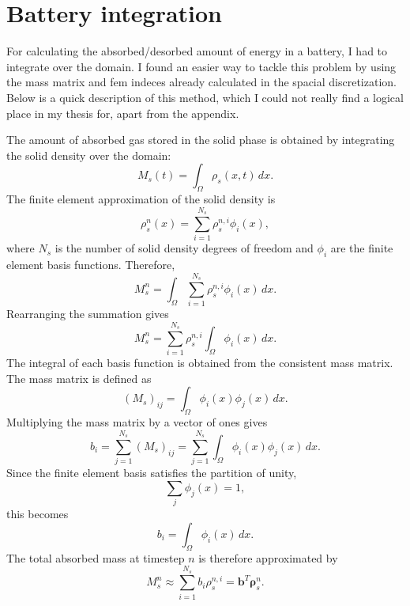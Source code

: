 \section{Battery integration}
For calculating the absorbed/desorbed amount of energy in a battery, I had to integrate over the domain. I found an easier way to tackle this problem by using the mass matrix and fem indeces already calculated in the spacial discretization. Below is a quick description of this method, which I could not really find a logical place in my thesis for, apart from the appendix.

The amount of absorbed gas stored in the solid phase is obtained by integrating the solid density over the domain:
\begin{equation}
M_s(t)=\int_{\Omega}\rho_s(x,t)\,dx .
\end{equation}
The finite element approximation of the solid density is
\begin{equation}
\rho_s^n(x)=\sum_{i=1}^{N_s} \rho_s^{n,i}\phi_i(x),
\end{equation}
where $N_s$ is the number of solid density degrees of freedom and
$\phi_i$ are the finite element basis functions. Therefore,
\begin{equation}
M_s^n
=
\int_{\Omega}
\sum_{i=1}^{N_s}\rho_s^{n,i}\phi_i(x)\,dx .
\end{equation}
Rearranging the summation gives
\begin{equation}
M_s^n
=
\sum_{i=1}^{N_s}
\rho_s^{n,i}
\int_{\Omega}\phi_i(x)\,dx .
\end{equation}
The integral of each basis function is obtained from the consistent mass matrix.
The mass matrix is defined as
\begin{equation}
(M_s)_{ij}
=
\int_{\Omega}\phi_i(x)\phi_j(x)\,dx .
\end{equation}
Multiplying the mass matrix by a vector of ones gives
\begin{equation}
b_i
=
\sum_{j=1}^{N_s}(M_s)_{ij}
=
\sum_{j=1}^{N_s}
\int_{\Omega}\phi_i(x)\phi_j(x)\,dx .
\end{equation}
Since the finite element basis satisfies the partition of unity,
\begin{equation}
\sum_j\phi_j(x)=1,
\end{equation}
this becomes
\begin{equation}
b_i
=
\int_{\Omega}\phi_i(x)\,dx .
\end{equation}
The total absorbed mass at timestep $n$ is therefore approximated by
\begin{equation}
M_s^n
\approx
\sum_{i=1}^{N_s}b_i\rho_s^{n,i}
=
\mathbf{b}^T\boldsymbol{\rho}_s^n .
\end{equation}  
